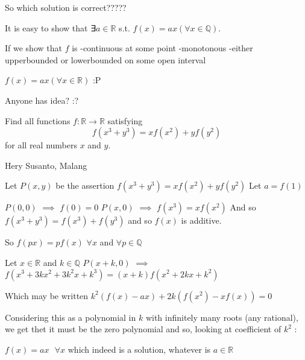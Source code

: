 


\begin{solution}
	So which solution is correct?????
\end{solution}



\begin{solution}
	It is easy to show that ∃$a\in \mathbb R$ s.t. $f(x)=ax(\forall x\in \mathbb Q)$.

If we show that $f$ is
-continuous at some point
-monotonous
-either upperbounded or lowerbounded on some open interval

$f(x)=ax(\forall x\in \mathbb R)$ :P

Anyone has idea? :?
\end{solution}



\begin{solution}
	\begin{tcolorbox}Find all functions $ f: \mathbb{R} \rightarrow \mathbb{R}$ satisfying \[ f(x^3+y^3)=xf(x^2)+yf(y^2)\] for all real numbers $ x$ and $ y$.
\begin{italicized}Hery Susanto, Malang\end{italicized}\end{tcolorbox}

Let $P(x,y)$ be the assertion $f(x^3+y^3)=xf(x^2)+yf(y^2)$
Let $a=f(1)$

$P(0,0)$ $\implies$ $f(0)=0$
$P(x,0)$ $\implies$ $f(x^3)=xf(x^2)$
And so $f(x^3+y^3)=f(x^3)+f(y^3)$ and so $f(x)$ is additive.

So $f(px)=pf(x)$ $\forall x$ and $\forall p\in\mathbb Q$

Let $x\in\mathbb R$ and $k\in\mathbb Q$
$P(x+k,0)$ $\implies$ $f(x^3+3kx^2+3k^2x+k^3)=(x+k)f(x^2+2kx+k^2)$

Which may be written $k^2(f(x)-ax)+2k(f(x^2)-xf(x))=0$

Considering this as a polynomial in $k$ with infinitely many roots (any rational), we get thet it must be the zero polynomial and so, looking at coefficient of $k^2$ :

$\boxed{f(x)=ax\text{  }\forall x}$ which indeed is a solution, whatever is $a\in\mathbb R$


\end{solution}



